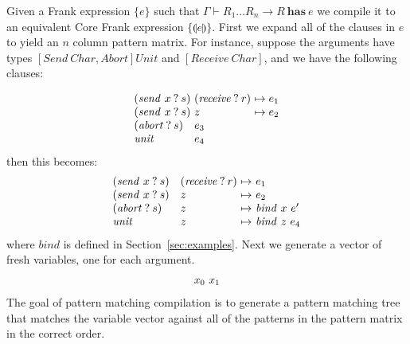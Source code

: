 \documentclass[preprint]{sigplanconf}
\newcommand{\pc}[1]{\llparenthesis{#1}\rrparenthesis}
\newcommand\ba{\begin{array}}
\newcommand\ea{\end{array}}
\newcommand{\judgeword}[1]{~\mathbf{#1}~}
\newcommand{\does}[3]{#1 \vdash {#2} \judgeword{has} {#3}}
\newcommand{\doesg}{\does{\Gamma}}
\newcommand{\effbox}[1]{[#1]}
\newcommand{\var}{\mathit}
\newcommand{\handleSymbol}{\mathbin{?}}
\newcommand{\handle}[2]{{#1} \handleSymbol {#2}}
\newcommand{\thunk}[1]{\{{#1}\}}
\begin{document}
\begin{sloppypar}
Given a Frank expression $\thunk{e}$ such that $\doesg{R_1 \dots R_n
  \to R}{e}$
%
we compile it to an equivalent Core Frank expression $\thunk{\pc{e}}$.
%
First we expand all of the clauses in $e$ to yield an $n$ column
pattern matrix. For instance, suppose the arguments have types
$\effbox{\var{Send~Char}, \var{Abort}}\var{Unit}$ and
$\effbox{\var{Receive~Char}}$, and we have the following clauses:
\end{sloppypar}
\[
\ba{@{}l@{~}l@{~}l@{}}
  (\handle{\var{send}~x}{s}) & (\handle{\var{receive}}{r}) & \mapsto e_1 \\
  (\handle{\var{send}~x}{s}) & z & \mapsto e_2 \\
  (\handle{\var{abort}}{s})  & e_3 \\
  \var{unit} & e_4 \\
\ea
\]
%
then this becomes:
%
\[
\ba{@{}l@{\quad}l@{~\mapsto~}l@{}}
  (\handle{\var{send}~x}{s}) & (\handle{\var{receive}}{r}) & e_1 \\
  (\handle{\var{send}~x}{s}) & z & e_2 \\
  (\handle{\var{abort}}{s})  & z & \var{bind}~x~e' \\
  \var{unit}                 & z & \var{bind}~z~e_4 \\
\ea
\]
%
where $\var{bind}$ is defined in Section~\ref{sec:examples}.
%
Next we generate a vector of fresh variables, one for each argument.
\[
\ba{@{}l@{~}l@{}}
  x_0 & x_1
\ea
\]
The goal of pattern matching compilation is to generate a pattern
matching tree that matches the variable vector against all of the
patterns in the pattern matrix in the correct order.
\end{document}
